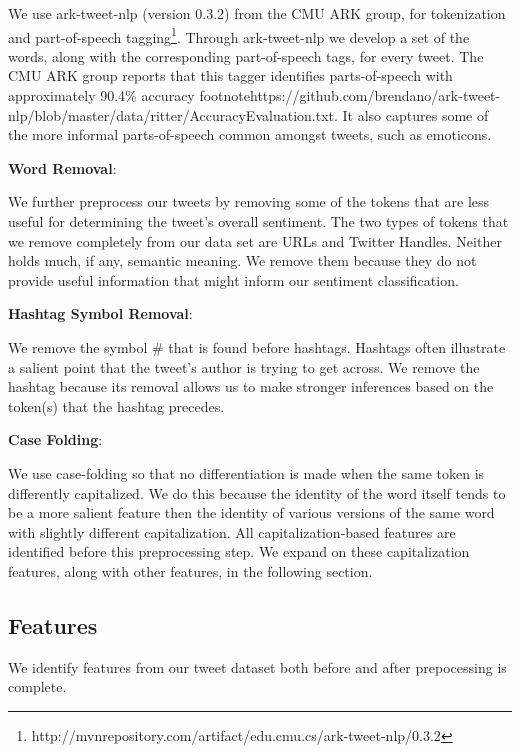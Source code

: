 \documentclass[11pt,letterpaper]{article}
\begin{document}
We use ark-tweet-nlp (version 0.3.2) from the CMU ARK group, for tokenization and part-of-speech tagging\footnote{http://mvnrepository.com/artifact/edu.cmu.cs/ark-tweet-nlp/0.3.2}. Through ark-tweet-nlp we develop a set of the words, along with the corresponding part-of-speech tags, for every tweet. The CMU ARK group reports that this tagger identifies parts-of-speech with approximately 90.4\% accuracy footnote{https://github.com/brendano/ark-tweet-nlp/blob/master/data/ritter/AccuracyEvaluation.txt}. It also captures some of the more informal parts-of-speech common amongst tweets, such as emoticons. 

\vspace{3 mm}
\noindent
{\bf Word Removal}:

We further preprocess our tweets by removing some of the tokens that are less useful for determining the tweet’s overall sentiment. The two types of tokens that we remove completely from our data set are URLs and Twitter Handles. Neither holds much, if any, semantic meaning. We remove them because they do not provide useful information that might inform our sentiment classification. 

\vspace{3 mm}
\noindent
{\bf Hashtag Symbol Removal}:

We remove the symbol \# that is found before hashtags. Hashtags often illustrate a salient point that the tweet’s author is trying to get across. We remove the hashtag because its removal allows us to make stronger inferences based on the token(s) that the hashtag precedes.

\vspace{3 mm}
\noindent
{\bf Case Folding}:

We use case-folding so that no differentiation is made when the same token is differently capitalized. We do this because the identity of the word itself tends to be a more salient feature then the identity of various versions of the same word with slightly different capitalization. All capitalization-based features are identified before this preprocessing step. We expand on these capitalization features, along with other features, in the following section.

\subsection{Features}
\label{ssec:layout}
We identify features from our tweet dataset both before and after prepocessing is complete. 
\end{document}
